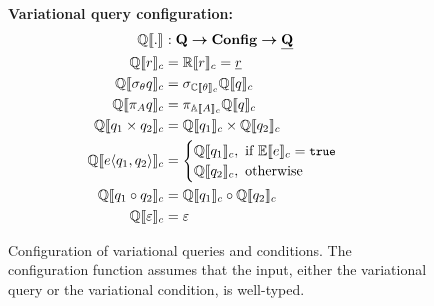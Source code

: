 \begin{figure}
\medskip
\textbf{Variational query configuration:}
\begin{alignat*}{1}
\eeSem [] . &: \qSet \totype \confSet \totype \pQSet\\
%
\eeSem \vRel &= \orSem \vRel = \pRel\\
\eeSem {\vSel \vQ}  &= \vSel [\ecSem \vCond] {\eeSem \vQ}\\
%
\eeSem {\vPrj [\vAttList] \vQ} &= \vPrj [\olSem \vAttList] {\eeSem \vQ}\\
%
%
\eeSem {{\vQ_1} \times {\vQ_2}} &= \eeSem {\vQ_1} \times \eeSem {\vQ_2}\\
%
%
\eeSem {\chc {\vQ_1, \vQ_2}} &= 
	\begin{cases}
		\eeSem {\vQ_1}, \text{ if } \fSem \dimMeta = \t\\
		\eeSem {\vQ_2}, \text{ otherwise}
	\end{cases}\\
%
\eeSem {{\vQ_1} \circ {\vQ_2}} &= \eeSem {\vQ_1} \circ \eeSem {\vQ_2}\\
%
\eeSem {\empRel} &= \empPRel
\end{alignat*}
\caption[Configuration of variational queries and conditions]{Configuration of variational queries and conditions. 
The configuration function assumes that the input, either the variational query or
the variational condition,
is well-typed. 
}
\label{fig:v-alg-conf-sem}
\end{figure}
